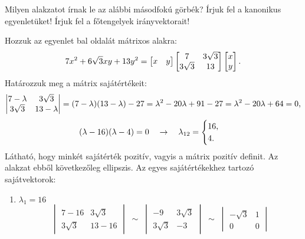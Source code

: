 \begin{exercise}{%
    Milyen alakzatot írnak le az alábbi másodfokú görbék?
    Írjuk fel a kanonikus egyenletüket!
    Írjuk fel a főtengelyek irányvektorait!
  }
{\begin{enumerate}[a)]
            Hozzuk az egyenlet bal oldalát mátrixos alakra:
            \[
              7x^2 + 6\sqrt{3} xy + 13y^2 =
              \begin{bmatrix} x & y \end{bmatrix}
              \begin{bmatrix} 7 & 3\sqrt{3} \\ 3\sqrt{3} & 13 \end{bmatrix}
              \begin{bmatrix} x \\ y \end{bmatrix}
              \text.
            \]
            Határozzuk meg a mátrix sajátértékeit:
            \[
              \begin{vmatrix} 7 - \lambda & 3\sqrt{3} \\ 3\sqrt{3} & 13 - \lambda \end{vmatrix}
              = (7 - \lambda)(13 - \lambda) - 27
              = \lambda^2 - 20 \lambda + 91 - 27
              = \lambda^2 - 20 \lambda + 64
              = 0
              \text,
            \]
            \[
              (\lambda - 16)(\lambda - 4) = 0
              \quad \rightarrow \quad
              \lambda_{12} = \begin{cases}
                16 \text, \\
                4 \text.
              \end{cases}
            \]
            Látható, hogy minkét sajátérték pozitív, vagyis a mátrix pozitív
            definit. Az alakzat ebből következőleg ellipszis.
            Az egyes sajátértékekhez tartozó sajátvektorok:
            \begin{enumerate}[1)]
              \item $\lambda_1 = 16$
                    \[
                      \begin{vmatrix}
                        7 - 16     & 3 \sqrt{3} \\
                        3 \sqrt{3} & 13 - 16
                      \end{vmatrix} \;\sim\; \begin{vmatrix}
                        -9         & 3 \sqrt{3} \\
                        3 \sqrt{3} & -3
                      \end{vmatrix} \;\sim\; \begin{vmatrix}
                        -\sqrt{3} & 1 \\
                        0         & 0

\end{vmatrix}\]
\end{enumerate}
\end{enumerate}}
\end{exercise}
